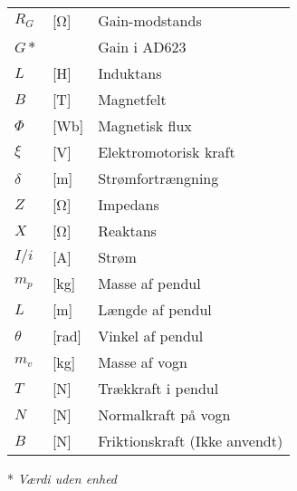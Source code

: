 \begin{table}[h!]
\begin{threeparttable}
\begin{tabular}{l l l}
$R_G$				&	[\si{\ohm}]					& Gain-modstands\\
$G*$				&								& Gain i AD623\\	
$L$					&	[\si{\henry}]				& Induktans\\
$B$					&	[\si{\tesla}]				& Magnetfelt\\
$\Phi$				&	[\si{\weber}]				& Magnetisk flux\\
$\xi$				&	[\si{\volt}]				& Elektromotorisk kraft\\
$\delta$			&	[\si{\m}]					& Strømfortrængning\\
$Z$					&	[\si{\ohm}]					& Impedans\\	
$X$					&	[\si{\ohm}]					& Reaktans\\
$I/i$				&	[\si{\ampere}]				& Strøm\\
$m_p$					&	[\si{\kilogram}]	 & Masse af pendul  		\\
$L$					&	[\si{\meter}]	 & Længde af pendul 		\\
$\theta$					&	[\si{\radian}]	 & Vinkel af pendul 		\\
$m_v$					&	[\si{\kilogram}]	 & Masse af vogn 		\\
$T$					&	[\si{\newton}]	 & Trækkraft i pendul 		\\
$N$					&	[\si{\newton}]	 & Normalkraft på vogn 		\\
$B$					&	[\si{\newton}]	 & Friktionskraft (Ikke anvendt) 		\\
\bottomrule
\end{tabular}
\begin{tablenotes}
\item[*] \textit{Værdi uden enhed}
\end{tablenotes}
\end{threeparttable}
\end{table}




